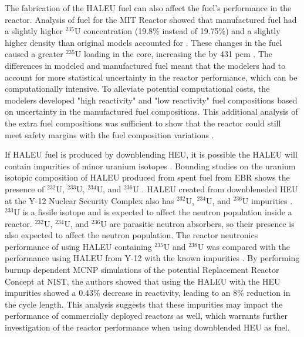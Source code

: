 The fabrication of the \gls{HALEU} fuel can also affect the fuel's 
performance in the reactor. Analysis of fuel for the \gls{MIT} 
Reactor showed that manufactured fuel had a slightly higher $^{235}$U 
concentration (19.8\% instead of 19.75\%) and a slightly higher 
density than original models accounted for \cite{mascolino_impact_2022}. 
These changes in the fuel caused a greater $^{235}$U loading in the core, 
increasing the \keff by 431 pcm \cite{mascolino_impact_2022}. The 
differences in modeled and manufactured fuel meant that the modelers 
had to account for more statistical uncertainty in the reactor performance, 
which can be computationally intensive. To alleviate potential 
computational costs, the modelers developed "high reactivity" and 
"low reactivity" fuel compositions based on uncertainty in the manufactured 
fuel compositions. This additional analysis of the extra fuel compositions 
was sufficient to show that the reactor could still meet safety margins 
with the fuel composition variations \cite{mascolino_impact_2022}.

If \gls{HALEU} fuel is produced by downblending \gls{HEU}, it is possible 
the \gls{HALEU} will contain impurities of minor uranium 
isotopes \cite{nuclear_energy_institute_establishing_2022}. Bounding studies on the 
uranium 
isotopic composition of \gls{HALEU} produced from spent fuel from \gls{EBR} 
shows the presence of $^{232}$U, $^{233}$U, $^{234}$U, and $^{236}$U
\cite{vaden_isotopic_2018}. 
\gls{HALEU} created from downbleneded \gls{HEU} at the Y-12 Nuclear Security 
Complex also has $^{232}$U, $^{234}$U, and $^{236}$U impurities
\cite{nelson_foreign_2010}. $^{233}$U is a fissile 
isotope and is expected to affect the neutron population inside a reactor.
$^{232}$U, $^{234}$U, and $^{236}$U are parasitic neutron absorbers, so 
their presence is also expected to affect the neutron population. The 
reactor neutronics performance of using \gls{HALEU} containing $^{235}$U 
and $^{238}$U was compared 
with the performance using \gls{HALEU} from Y-12 with the known impurities 
\cite{celikten_effects_2021}. By performing burnup dependent \gls{MCNP} 
simulations of the potential Replacement Reactor Concept at \gls{NIST}, 
the authors showed that using the \gls{HALEU} with the \gls{HEU} 
impurities showed a 0.43\% decrease in reactivity, leading to an 8\% reduction 
in the cycle length. This analysis suggests that these impurities may 
impact the performance of commercially deployed reactors as well, which 
warrants further investigation of the reactor performance when using 
downblended \gls{HEU} as fuel. 
